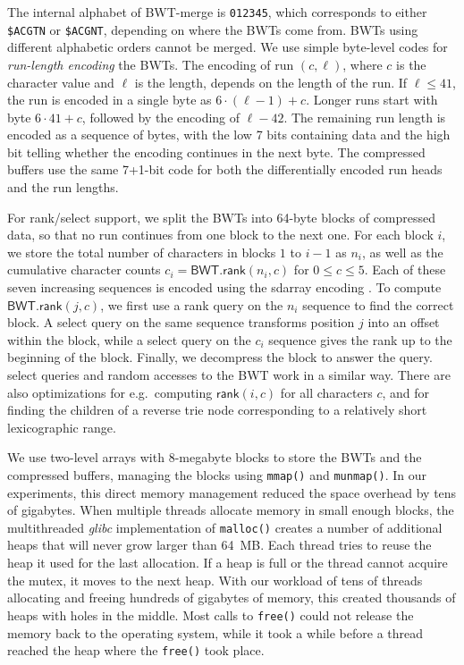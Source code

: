 \documentclass[smallabstract,smallcaptions]{dccpaper}
\newcommand{\BWT}{\textsf{BWT}}
\newcommand{\mBWT}{\ensuremath{\mathsf{BWT}}}
\newcommand{\rank}{\textsf{rank}}
\newcommand{\select}{\textsf{select}}
\newcommand{\mrank}{\ensuremath{\mathsf{rank}}}
\newcommand{\BWTmerge}{\textsf{BWT\nobreakdash-merge}}
\newcommand{\sdarray}{\textsf{sdarray}}
\begin{document}
The internal alphabet of \BWTmerge{} is \texttt{012345}, which corresponds to either \texttt{\$ACGTN} or \texttt{\$ACGNT}, depending on where the \BWT{}s come from. \BWT{}s using different alphabetic orders cannot be merged. We use simple byte-level codes for \emph{run-length encoding} the \BWT{}s. The encoding of run $(c, \ell)$, where $c$ is the character value and $\ell$ is the length, depends on the length of the run. If $\ell \le 41$, the run is encoded in a single byte as $6 \cdot (\ell-1) + c$. Longer runs start with byte $6 \cdot 41 + c$, followed by the encoding of $\ell-42$. The remaining run length is encoded as a sequence of bytes, with the low 7 bits containing data and the high bit telling whether the encoding continues in the next byte. The compressed buffers use the same 7+1\nobreakdash-bit code for both the differentially encoded run heads and the run lengths.

For \rank/\select{} support, we split the \BWT{}s into 64\nobreakdash-byte blocks of compressed data, so that no run continues from one block to the next one. For each block $i$, we store the total number of characters in blocks $1$ to $i-1$ as $n_{i}$, as well as the cumulative character counts $c_{i} = \mBWT.\mrank(n_{i},c)$ for $0 \le c \le 5$. Each of these seven increasing sequences is encoded using the \sdarray{} encoding \cite{Okanohara2007}. To compute $\mBWT.\mrank(j,c)$, we first use a \rank{} query on the $n_{i}$ sequence to find the correct block. A \select{} query on the same sequence transforms position $j$ into an offset within the block, while a \select{} query on the $c_{i}$ sequence gives the rank up to the beginning of the block. Finally, we decompress the block to answer the query. \select{} queries and random accesses to the \BWT{} work in a similar way. There are also optimizations for e.g.~computing $\mrank(i,c)$ for all characters $c$, and for finding the children of a reverse trie node corresponding to a relatively short lexicographic range.

We use two-level arrays with 8\nobreakdash-megabyte blocks to store the \BWT{}s and the compressed buffers, managing the blocks using \texttt{mmap()} and \texttt{munmap()}. In our experiments, this direct memory management reduced the space overhead by tens of gigabytes. When multiple threads allocate memory in small enough blocks, the multithreaded \emph{glibc} implementation of \texttt{malloc()} creates a number of additional heaps that will never grow larger than 64~MB. Each thread tries to reuse the heap it used for the last allocation. If a heap is full or the thread cannot acquire the mutex, it moves to the next heap. With our workload of tens of threads allocating and freeing hundreds of gigabytes of memory, this created thousands of heaps with holes in the middle. Most calls to \texttt{free()} could not release the memory back to the operating system, while it took a while before a thread reached the heap where the \texttt{free()} took place.
\end{document}

